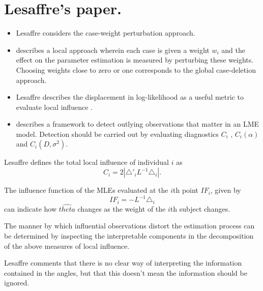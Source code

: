 \documentclass[Main.tex]{subfiles}
\begin{document}
	\newpage
\newpage
\section{Lesaffre's paper.} %

\begin{itemize}
\item Lesaffre considers the case-weight perturbation approach.




\item \citep{cook86} describes a local approach wherein each case is given a weight $w_{i}$ and the effect on the parameter estimation is measured by perturbing these weights. Choosing weights close to zero or one corresponds to the global case-deletion approach.


\item Lesaffre  describes the displacement in log-likelihood as a useful metric to evaluate local influence \citep{cook86}.




\item \citet{lesaffre} describes a framework to detect outlying observations that matter in an LME model. Detection should be carried out by evaluating diagnostics $C_{i}$ , $C_{i}(\alpha)$ and $C_{i}(D,\sigma^2)$.
\end{itemize}






Lesaffre defines the total local influence of individual $i$ as
\begin{equation}
C_{i} = 2 | \triangle \prime _{i} L^{-1} \triangle_{i}|.
\end{equation}




The influence function of the MLEs evaluated at the $i$th point $IF_{i}$, given by
\begin{equation}
IF_{i} = -L^{-1}\triangle _{i}
\end{equation}
can indicate how $\hat{theta}$ changes as the weight of the $i$th
subject changes.


The manner by which influential observations distort the estimation process can be determined by inspecting the
interpretable components in the decomposition of the above measures of local influence.




Lesaffre comments that there is no clear way of interpreting the information contained in the angles, but that this doesn't mean the information should be ignored.





\end{document}
